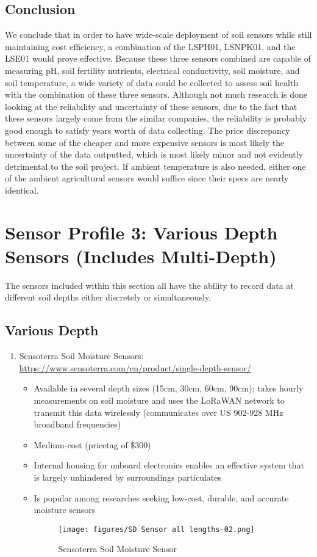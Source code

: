 \documentclass{article}
\begin{document}
\subsection{Conclusion}
We conclude that in order to have wide-scale deployment of soil sensors while still maintaining cost efficiency, a combination of the LSPH01, LSNPK01, and the LSE01 would prove effective. Because these three sensors combined are capable of measuring pH, soil fertility nutrients, electrical conductivity, soil moisture, and soil temperature, a wide variety of data could be collected to assess soil health with the combination of these three sensors. Although not much research is done looking at the reliability and uncertainty of these sensors, due to the fact that these sensors largely come from the similar companies, the reliability is probably good enough to satisfy years worth of data collecting. The price discrepancy between some of the cheaper and more expensive sensors is most likely the uncertainty of the data outputted, which is most likely minor and not evidently detrimental to the soil project. If ambient temperature is also needed, either one of the ambient agricultural sensors would suffice since their specs are nearly identical.

\section{Sensor Profile 3: Various Depth Sensors (Includes Multi-Depth)}
The sensors included within this section all have the ability to record data at different soil depths either discretely or simultaneously.

\subsection{Various Depth}  
\begin{enumerate}
\item Sensoterra Soil Moisture Sensors: \url{https://www.sensoterra.com/en/product/single-depth-sensor/}
\begin{itemize}

    \item Available in several depth sizes (15cm, 30cm, 60cm, 90cm); takes hourly measurements on soil moisture and uses the LoRaWAN network to transmit this data wirelessly (communicates over US 902-928 MHz broadband frequencies)
    \item Medium-cost (pricetag of \$300)
    \item Internal housing for onboard electronics enables an effective system that is largely unhindered by surroundings particulates
    \item Is popular among researches seeking low-cost, durable, and accurate moisture sensors
    
 \begin{figure}[htp]
    \centering
    \texttt{[image: figures/SD Sensor all lengths-02.png]}
    \caption{Sensoterra Soil Moisture Sensor}
\end{figure}


\end{itemize}
\end{enumerate}
\end{document}
